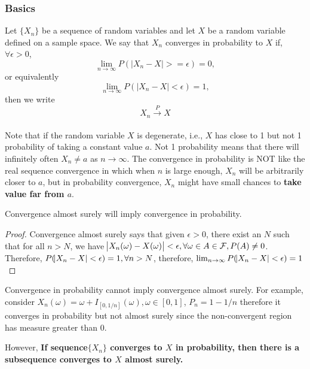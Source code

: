 \begin{refsection}
\subsubsection{Basics}
\begin{definition}
\cite{hoggintroduction}Let $\{X_n\}$ be a sequence of random variables and let $X$ be a random variable defined on a sample space. We say that $X_n$ converges in probability to $X$ if, $\forall \epsilon > 0 $, $$\lim_{n\rightarrow \infty} P(|X_n-X|>=\epsilon) = 0,$$ or equivalently $$\lim_{n\rightarrow \infty} P(|X_n-X|<\epsilon) = 1,$$
then we write $$X_n \xrightarrow[ ]{P} X $$
\end{definition}

\begin{remark}
Note that if the random variable $X$ is degenerate, i.e., $X$ has close to 1 but not 1 probability  of taking a constant value $a$. Not 1 probability means that there will infinitely often $X_n \neq a$ as $n \rightarrow \infty$. The convergence in probability is NOT like the real sequence convergence in which when $n$ is large enough, $X_n$ will be arbitrarily closer to $a$, but in probability convergence, $X_n$ might have small chances to \textbf{take value far from $a$}.
\end{remark}

\begin{lemma}
\cite{de2012understanding}\cite{casella2002statistical}Convergence almost surely will imply convergence in probability.
\end{lemma}
\begin{proof}
	Convergence almost surely says that given $\epsilon > 0$, there exist an $N$ such that for all $n > N$, we have $\abs{X_n(\omega) - X(\omega)} < \epsilon, \forall \omega \in A \in \mathcal{F},P(A) \neq 0$. Therefore, $P(\abs{X_n-X}<\epsilon) = 1,\forall n > N$, therefore, $\lim_{n\to \infty} P(\abs{X_n-X}<\epsilon) = 1$
\end{proof}


\begin{remark}
 Convergence in probability cannot imply convergence almost surely. For example, consider $X_n(\omega)=\omega + I_{[0,1/n]}(\omega),\omega \in [0,1]$, $P_n = 1-1/n$ therefore it converges in probability but not almost surely since the non-convergent region has measure greater than 0.

However, \textbf{If sequence$\{X_n\}$ converges to $X$ in probability, then there is a subsequence converges to $X$ almost surely. }
\end{remark}



\end{refsection}
